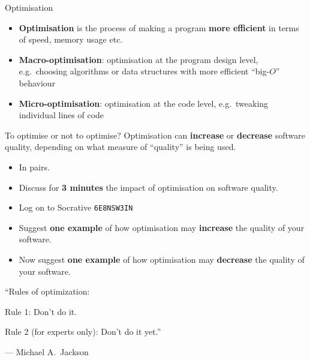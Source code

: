 
\begin{frame}{Optimisation}
	\begin{itemize}
		\item \textbf{Optimisation} is the process of making a program \textbf{more efficient}
			in terms of speed, memory usage etc. \pause
		\item \textbf{Macro-optimisation}: optimisation at the program design level,
			e.g.\ choosing algorithms or data structures with more efficient ``big-$O$'' behaviour \pause
		\item \textbf{Micro-optimisation}: optimisation at the code level,
			e.g.\ tweaking individual lines of code
	\end{itemize}
\end{frame}

\begin{frame}{To optimise or not to optimise?}
	Optimisation can \textbf{increase} or \textbf{decrease} software quality,
	depending on what measure of ``quality'' is being used. \pause
	\begin{itemize}
		\item In pairs.
		\item Discuss for \textbf{3 minutes} the impact of optimisation on software quality.
		\item Log on to Socrative \texttt{6E8NSW3IN}
		\item Suggest \textbf{one example} of how optimisation may \textbf{increase} the quality of your software. \pause
		\item Now suggest \textbf{one example} of how optimisation may \textbf{decrease} the quality of your software.
	\end{itemize}
\end{frame}

\begin{frame}
	\begin{center}
		``Rules of optimization:
		
		Rule 1: Don't do it.
		
		Rule 2 (for experts only): Don't do it yet.''
	\end{center}
	\begin{flushright}
		--- Michael A.\ Jackson
	\end{flushright}
\end{frame}

